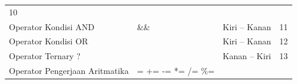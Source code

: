 \begin{longtable}[]{@{}llll@{}}
\begin{minipage}[t]{0.05\columnwidth}
10
\strut\end{minipage}\tabularnewline
\begin{minipage}[t]{0.52\columnwidth}\raggedright\strut
Operator Kondisi AND
\strut\end{minipage} &
\begin{minipage}[t]{0.17\columnwidth}\raggedright\strut
\&\&
\strut\end{minipage} &
\begin{minipage}[t]{0.14\columnwidth}\raggedright\strut
Kiri -- Kanan
\strut\end{minipage} &
\begin{minipage}[t]{0.05\columnwidth}\raggedright\strut
11
\strut\end{minipage}\tabularnewline
\begin{minipage}[t]{0.52\columnwidth}\raggedright\strut
Operator Kondisi OR
\strut\end{minipage} &
\begin{minipage}[t]{0.17\columnwidth}\raggedright\strut
\texttt{\textbar{}\textbar{}}
\strut\end{minipage} &
\begin{minipage}[t]{0.14\columnwidth}\raggedright\strut
Kiri -- Kanan
\strut\end{minipage} &
\begin{minipage}[t]{0.05\columnwidth}\raggedright\strut
12
\strut\end{minipage}\tabularnewline
\begin{minipage}[t]{0.52\columnwidth}\raggedright\strut
Operator Ternary ?
\strut\end{minipage} &
\begin{minipage}[t]{0.17\columnwidth}\raggedright\strut
\texttt{\textbar{}}
\strut\end{minipage} &
\begin{minipage}[t]{0.14\columnwidth}\raggedright\strut
Kanan -- Kiri
\strut\end{minipage} &
\begin{minipage}[t]{0.05\columnwidth}\raggedright\strut
13
\strut\end{minipage}\tabularnewline
\begin{minipage}[t]{0.52\columnwidth}\raggedright\strut
Operator Pengerjaan Aritmatika
\strut\end{minipage} &
\begin{minipage}[t]{0.17\columnwidth}\raggedright\strut
= += -= *= /= \%=
\strut\end{minipage} &
\begin{minipage}[t]{0.14\columnwidth}\raggedright\strut

\end{minipage}
\end{longtable}
